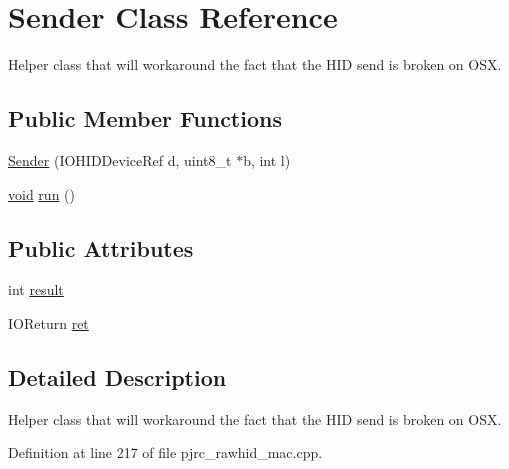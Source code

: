 \hypertarget{class_sender}{\section{\-Sender \-Class \-Reference}
\label{class_sender}
}


\-Helper class that will workaround the fact that the \-H\-I\-D send is broken on \-O\-S\-X.  


\subsection*{\-Public \-Member \-Functions}
\begin{DoxyCompactItemize}
\item 
\hyperlink{class_sender_a19eb078b590743ee8d1fc06f23bca1a1}{\-Sender} (\-I\-O\-H\-I\-D\-Device\-Ref d, uint8\-\_\-t $\ast$b, int l)
\item 
\hyperlink{group___u_a_v_objects_plugin_ga444cf2ff3f0ecbe028adce838d373f5c}{void} \hyperlink{class_sender_a958fef41c40a128fafd2603d53602b5e}{run} ()
\end{DoxyCompactItemize}
\subsection*{\-Public \-Attributes}
\begin{DoxyCompactItemize}
\item 
int \hyperlink{class_sender_ad94f4ce0c27858f3f34e11a4d97f6f1d}{result}
\item 
\-I\-O\-Return \hyperlink{class_sender_aff1c122c343fa8ae82aa5b36ae2a17a7}{ret}
\end{DoxyCompactItemize}


\subsection{\-Detailed \-Description}
\-Helper class that will workaround the fact that the \-H\-I\-D send is broken on \-O\-S\-X. 

\-Definition at line 217 of file pjrc\-\_\-rawhid\-\_\-mac.\-cpp.



